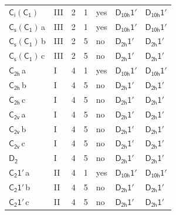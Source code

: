 \documentclass[10pt,a4paper]{article}
\numberwithin{equation}{section}
\newcommand{\grp}[1]{\mathsf{#1}}
\newcommand{\clsletter}[1]{\,{\scriptsize\color{black!55}#1}}
\begin{document}
{\begin{longtable}{@{}llrrlll@{}}
\href{S2-C1.pdf}{$\grp{C_{i}}(\grp{C_{1}})$} & III & 2 & 1 & yes & \href{D10h-1p.pdf}{$\grp{D_{10h}1'}$} & \href{D10h-1p.pdf}{$\grp{D_{10h}1'}$}\\
\href{C1v-C1.pdf}{$\grp{C_{s}}(\grp{C_{1}})$}\clsletter{a} & III & 2 & 1 & yes & \href{D10h-1p.pdf}{$\grp{D_{10h}1'}$} & \href{D10h-1p.pdf}{$\grp{D_{10h}1'}$}\\
\href{C1v-C1.pdf}{$\grp{C_{s}}(\grp{C_{1}})$}\clsletter{b} & III & 2 & 5 & no & \href{D2h-1p.pdf}{$\grp{D_{2h}1'}$} & \href{D2h-1p.pdf}{$\grp{D_{2h}1'}$}\\
\href{C1v-C1.pdf}{$\grp{C_{s}}(\grp{C_{1}})$}\clsletter{c} & III & 2 & 5 & no & \href{D2h-1p.pdf}{$\grp{D_{2h}1'}$} & \href{D2h-1p.pdf}{$\grp{D_{2h}1'}$}\\
\href{../../../rotation/data/pdf/C2h.pdf}{$\grp{C_{2h}}$}\clsletter{a} & I & 4 & 1 & yes & \href{D10h-1p.pdf}{$\grp{D_{10h}1'}$} & \href{D10h-1p.pdf}{$\grp{D_{10h}1'}$}\\
\href{../../../rotation/data/pdf/C2h.pdf}{$\grp{C_{2h}}$}\clsletter{b} & I & 4 & 5 & no & \href{D2h-1p.pdf}{$\grp{D_{2h}1'}$} & \href{D2h-1p.pdf}{$\grp{D_{2h}1'}$}\\
\href{../../../rotation/data/pdf/C2h.pdf}{$\grp{C_{2h}}$}\clsletter{c} & I & 4 & 5 & no & \href{D2h-1p.pdf}{$\grp{D_{2h}1'}$} & \href{D2h-1p.pdf}{$\grp{D_{2h}1'}$}\\
\href{../../../rotation/data/pdf/C2v.pdf}{$\grp{C_{2v}}$}\clsletter{a} & I & 4 & 5 & no & \href{D2h-1p.pdf}{$\grp{D_{2h}1'}$} & \href{D2h-1p.pdf}{$\grp{D_{2h}1'}$}\\
\href{../../../rotation/data/pdf/C2v.pdf}{$\grp{C_{2v}}$}\clsletter{b} & I & 4 & 5 & no & \href{D2h-1p.pdf}{$\grp{D_{2h}1'}$} & \href{D2h-1p.pdf}{$\grp{D_{2h}1'}$}\\
\href{../../../rotation/data/pdf/C2v.pdf}{$\grp{C_{2v}}$}\clsletter{c} & I & 4 & 5 & no & \href{D2h-1p.pdf}{$\grp{D_{2h}1'}$} & \href{D2h-1p.pdf}{$\grp{D_{2h}1'}$}\\
\href{../../../rotation/data/pdf/D2.pdf}{$\grp{D_{2}}$} & I & 4 & 5 & no & \href{D2h-1p.pdf}{$\grp{D_{2h}1'}$} & \href{D2h-1p.pdf}{$\grp{D_{2h}1'}$}\\
\href{C2-1p.pdf}{$\grp{C_{2}1'}$}\clsletter{a} & II & 4 & 1 & yes & \href{D10h-1p.pdf}{$\grp{D_{10h}1'}$} & \href{D10h-1p.pdf}{$\grp{D_{10h}1'}$}\\
\href{C2-1p.pdf}{$\grp{C_{2}1'}$}\clsletter{b} & II & 4 & 5 & no & \href{D2h-1p.pdf}{$\grp{D_{2h}1'}$} & \href{D2h-1p.pdf}{$\grp{D_{2h}1'}$}\\
\href{C2-1p.pdf}{$\grp{C_{2}1'}$}\clsletter{c} & II & 4 & 5 & no & \href{D2h-1p.pdf}{$\grp{D_{2h}1'}$} & \href{D2h-1p.pdf}{$\grp{D_{2h}1'}$}\\

\end{longtable}}
\end{document}
